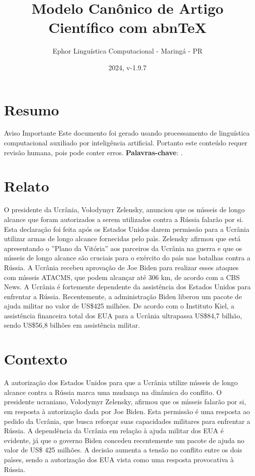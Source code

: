 \documentclass[article,11pt,oneside,a4paper,brazil,sumario=tradicional]{abntex2}%
\title{Modelo Canônico de Artigo Científico com abnTeX}%
\author{Ephor Linguística Computacional {-} Maringá {-} PR}%
\date{2024, v{-}1.9.7}%
\begin{document}
%
\normalsize%
\maketitle%
%
\frenchspacing%
\section*{Resumo}%
\label{sec:Resumo}%

                Aviso Importante
                Este documento foi gerado usando processamento de linguística computacional auxiliado por inteligência artificial. Portanto este conteúdo requer revisão humana, pois pode conter erros.
                \vspace{\onelineskip}
\textbf{Palavras-chave}: .

%
\section{Relato}%
\label{sec:Relato}%
O presidente da Ucr\^ania, Volodymyr Zelensky, anunciou que os m{\'\i}sseis de longo alcance que foram autorizados a serem utilizados contra a R\'ussia falar\~ao por si. Esta declara\c{c}\~ao foi feita ap\'os os Estados Unidos darem permiss\~ao para a Ucr\^ania utilizar armas de longo alcance fornecidas pelo pa{\'\i}s. Zelensky afirmou que est\'a apresentando o ''Plano da Vit\'oria'' aos parceiros da Ucr\^ania na guerra e que os m{\'\i}sseis de longo alcance s\~ao cruciais para o ex\'ercito do pa{\'\i}s nas batalhas contra a R\'ussia. A Ucr\^ania recebeu aprova\c{c}\~ao de Joe Biden para realizar esses ataques com m{\'\i}sseis ATACMS, que podem alcan\c{c}ar at\'e 306 km, de acordo com a CBS News. A Ucr\^ania \'e fortemente dependente da assist\^encia dos Estados Unidos para enfrentar a R\'ussia. Recentemente, a administra\c{c}\~ao Biden liberou um pacote de ajuda militar no valor de US\$425 milh\~oes. De acordo com o Instituto Kiel, a assist\^encia financeira total dos EUA para a Ucr\^ania ultrapassa US\$84,7 bilh\~ao, sendo US\$56,8 bilh\~oes em assist\^encia militar.

%
\section{Contexto}%
\label{sec:Contexto}%
A autoriza\c{c}\~ao dos Estados Unidos para que a Ucr\^ania utilize m{\'\i}sseis de longo alcance contra a R\'ussia marca uma mudan\c{c}a na din\^amica do conflito. O presidente ucraniano, Volodymyr Zelensky, afirmou que os m{\'\i}sseis falar\~ao por si, em resposta \`a autoriza\c{c}\~ao dada por Joe Biden. Esta permiss\~ao \'e uma resposta ao pedido da Ucr\^ania, que busca refor\c{c}ar suas capacidades militares para enfrentar a R\'ussia. A depend\^encia da Ucr\^ania em rela\c{c}\~ao \`a ajuda militar dos EUA \'e evidente, j\'a que o governo Biden concedeu recentemente um pacote de ajuda no valor de US\$ 425 milh\~oes. A decis\~ao aumenta a tens\~ao no conflito entre os dois pa{\'\i}ses, sendo a autoriza\c{c}\~ao dos EUA vista como uma resposta provocativa \`a R\'ussia.
\end{document}
